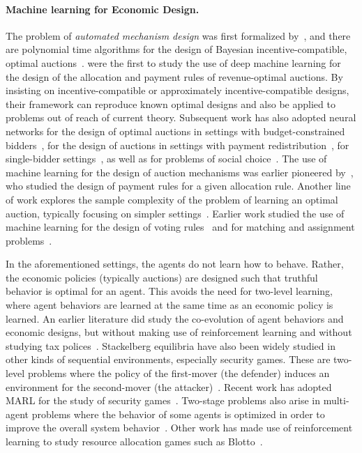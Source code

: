 \paragraph{Machine learning for Economic Design.}
The problem of {\em automated mechanism design} was first formalized by~\cite{ConitzerS02,ConitzerS04a}, and there are polynomial time algorithms for the design of Bayesian incentive-compatible, optimal auctions~\citep{CaiDW12a, CaiDW12b,CaiDW13}.  
  \cite{dutting_optimal_2019} were the first to study the use of deep machine learning for the design of the allocation and payment rules of revenue-optimal auctions. By insisting on incentive-compatible or approximately incentive-compatible designs, their framework can reproduce known optimal designs and also be applied to problems out of reach of current theory. Subsequent work has also adopted neural networks for the design of optimal auctions in settings with budget-constrained bidders~\citep{FengEtAl18},  for the design of  auctions in settings with payment redistribution~\citep{Tacchetti19}, for single-bidder settings~\citep{STZ18}, as well as for problems of social choice~\citep{GolowichEtAl18}.
The use of machine learning for the design of auction mechanisms was earlier pioneered by~\cite{DuettingFJLLP12}, who studied the design of payment rules for a given allocation rule.
Another line of work explores the sample complexity of the problem of learning an optimal auction, typically focusing on simpler settings~\citep{ColeR14,MorgensternR15,BalcanSV16,GonczarowskiW18}. Earlier work studied  the use of machine learning for the design of voting rules~\citep{procaccia09} and for matching and assignment problems~\citep{Narasimhan_ijcai16,Narasimhan_UAI16}.

In the aforementioned settings, the agents do not learn how to behave. Rather, the economic policies (typically auctions) are designed such that  truthful behavior is optimal for an agent.
This avoids the need for two-level learning, where agent behaviors are learned at the same time as an economic policy is learned. An earlier literature did study the co-evolution of  agent behaviors and economic designs, but without making use of reinforcement learning and without studying  tax polices~\citep{DBLP:conf/sigecom/Byde03,DBLP:conf/amec/PhelpsMPS02,DBLP:journals/aamas/PhelpsMP10}. %
Stackelberg equilibria have also been widely studied in other kinds of sequential environments, especially security games. These are two-level problems where the policy of the first-mover (the defender) induces an environment for the second-mover  (the attacker)~\citep{DBLP:conf/atal/PitaJMOPTWPK08,DBLP:books/daglib/0040483}. Recent work has  adopted MARL for the study of security games~\citep{DBLP:conf/aaai/WangSYWSJF19,DBLP:journals/corr/abs-1911-08799}. Two-stage problems also arise in multi-agent  problems where the behavior of some agents is optimized in order to improve the  overall system behavior~\citep{DBLP:conf/nips/DimitrakakisPRT17,DBLP:conf/nips/CarrollSHGSAD19,tylkin20}.
Other work has made use of reinforcement learning to study resource allocation games such as Blotto~\citep{DBLP:conf/icml/BalduzziGB0PJG19}.

